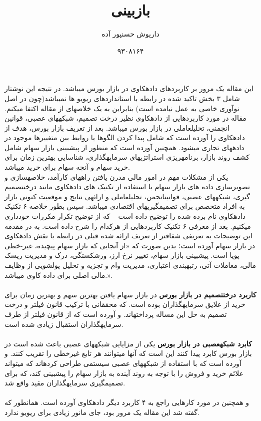 \documentclass[10pt,a4paper]{article}
\newcommand{\نیمفاصله}{\halfspace}
\renewcommand{\ }{\halfspace}
\begin{document}
\title{بازبینی\\
}
\author{داریوش حسن\ پور آده}
\date{۹۳۰۸۱۶۴}
\maketitle
\null
\vfill
\thispagestyle{empty}
\setcounter{page}{0}
\newpage
این مقاله یک مرور بر کاربردهای داده\ کاوی در بازار بورس می\ باشد. در نتیجه این نوشتار شامل ۳ بخش تاکید شده در رابطه با استانداردهای ریویو ها نمی\ باشد(چون در اصل نوآوری خاصی به عمل نیامده است) بنابراین به یک خلاصه\ ای از مقاله اکتفا میکنم.
مقاله در مورد کاربردهایی از داده\ کاوی نظیر درخت تصمیم، شبکه\ های عصبی، قوانین انجمنی، تحلیل\ عاملی در بازار بورس می\ باشد. بعد از تعریف بازار بورس، هدف از داده\ کاوی را آورده است که شامل پیدا کردن الگوها یا روابط بین متغییرها موجود در داده\ های تجاری می\ شود. همچنین آورده است که منظور از پیش\ بینی بازار سهام شامل کشف روند بازار، برنامه\ ریزی استراتژی\ های سرمایه\ گذاری، شناسایی بهترین زمان برای خرید سهام و آنچه سهام برای خرید می\ باشد.\\
یکی از مشکلات مهم در امور مالی مدرن یافتن راه\ های کارآمد، خلاصه\ سازی و تصویرسازی داده های بازار سهام با استفاده از تکنیک های داده\ کاوی مانند درخت\ تصمیم گیری، شبکه\ های عصبی، قوانین\ انجمن، تحلیل\ عاملی و ارائه\ ی نتایج و موقعیت کنونی بازار به افراد متخصص برای تصمیم\ گیری\ های اقتصادی می\ باشد.
سپس بطور خلاصه ۶ تکنیک داده\ کاوی نام برده شده را توضیح داده است -- که از توضیح تکرار مکررات خودداری میکنیم. بعد از معرفی ۶ تکنیک کاربردهایی از هرکدام را شرح داده است. به در مقدمه این توضیحات به تعریفی شفاف\ تر از تعریف ارائه شده قبلی در رابطه با نقش داده\ کاوی در بازار سهام آورده است؛ بدین صورت که «از آنجایی که بازار سهام پیچیده، غیر-خطی پویا است. پیش\ بینی بازار سهام، تغییر نرخ ارز، ورشکستگی، درک و مدیریت ریسک مالی، معاملات آتی، رتبه\ بندی اعتباری، مدیریت وام و تجزیه و تحلیل پول\ شویی از وظایف مالی اصلی برای داده کاوی می\ باشد.».\\\\
\textbf{کاربرد درخت\ تصمیم در بازار بورس}
در بازار سهام یافتن بهترین سهم و بهترین زمان برای خرید از علایق سرمایه\ گذاران بوده است. که محققانی با ترکیب قانون فیلتر و درخت تصمیم به حل این مساله پرداخته\ اند. و آورده است که از قانون فیلتر از طرف سرمایه\ گذاران استقبال زیادی شده است.\\\\
\textbf{کابرد شبکه\ عصبی در بازار بورس}
یکی از مزایایی شبکه\ های عصبی باعث شده است در بازار بورس کابرد پیدا کنند این است که آن\ ها می\ توانند هر تابع غیرخطی را تقریب کنند. و آورده است که با استفاده از شبکه\ های عصبی سیستمی طراحی کرده\ اند که می\ تواند علائم خرید و فروش را با توجه به روند آینده به بازار سهام را پیش\ بینی کند، که برای تصمیم\ گیری سرمایه\ گذاران مقید واقع شد.\\\\
و همچنین در مورد کارهایی راجع به ۴ کاربرد دیگر داده\ کاوی آورده است. همانطور که گفته شد این مقاله یک مرور بود، جای مانور زیادی برای ریویو ندارد.
\end{document}
